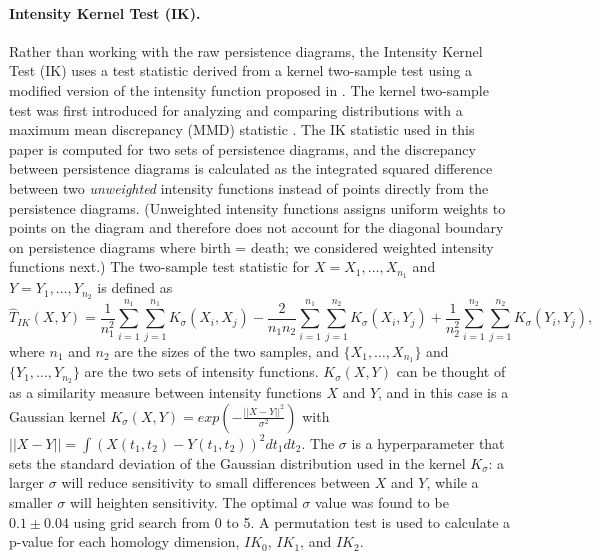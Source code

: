 \documentclass[12pt]{article}
\begin{document}
\paragraph{Intensity Kernel Test (IK).}
Rather than working with the raw persistence diagrams, the Intensity Kernel Test (IK) uses a test statistic derived from a kernel two-sample test using a modified version of the intensity function proposed in \citep{chen2015statistical}. The kernel two-sample test was first introduced for analyzing and comparing distributions with a maximum mean discrepancy (MMD) statistic \citep{gretton2012kernel}. The IK statistic used in this paper is computed for two sets of persistence diagrams, and the discrepancy between persistence diagrams is calculated as the integrated squared difference between two \emph{unweighted} intensity functions instead of points directly from the persistence diagrams. (Unweighted intensity functions assigns uniform weights to points on the diagram and therefore does not account for the diagonal boundary on persistence diagrams where birth = death; we considered weighted intensity functions next.) The two-sample test statistic for $X = X_1, \ldots, X_{n_1}$ and $Y = Y_1, \ldots, Y_{n_2}$ is defined as
%
\begin{equation}
\widehat{T}_{IK}(X, Y) = \frac{1}{n_1^{2}}\sum_{i=1}^{n_1}\sum_{j=1}^{n_1} K_{\sigma}(X_{i}, X_{j}) - \frac{2}{n_1n_2}\sum_{i=1}^{n_1}\sum_{j=1}^{n_2}K_{\sigma}(X_{i}, Y_{j}) + \frac{1}{n_2^{2}}\sum_{i=1}^{n_2}\sum_{j=1}^{n_2} K_{\sigma}(Y_{i}, Y_{j}), \label{eq:kernel_test}
\end{equation}
where $n_1$ and $n_2$ are the sizes of the two samples, and $\{X_1, \ldots, X_{n_1}\}$ and $\{Y_1, \ldots, Y_{n_2}\}$ are the two sets of intensity functions.  $K_{\sigma}(X,Y)$ can be thought of as a similarity measure between intensity functions $X$ and $Y$, and in this case is a Gaussian kernel $K_{\sigma}(X,Y) = exp(-\frac{||X - Y||^{2}}{\sigma^{2}})$ with  $||X - Y|| = \int \left(X(t_1, t_2) - Y(t_1, t_2)\right)^2dt_1dt_2$. The $\sigma$ is a hyperparameter that sets the standard deviation of the Gaussian distribution used in the kernel $K_{\sigma}$: a larger $\sigma$ will reduce sensitivity to small differences between $X$ and $Y$, while a smaller $\sigma$ will heighten sensitivity. The optimal $\sigma$ value was found to be $0.1 \pm 0.04$ using grid search from 0 to 5. A permutation test is used to calculate a p-value for each homology dimension, $IK_0$, $IK_1$, and $IK_2$.
\end{document}
